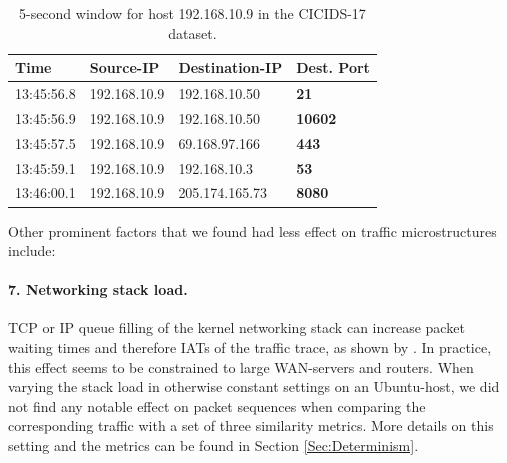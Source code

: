 \documentclass[runningheads]{llncs}
\begin{document}
\begin{table}[h!]
\centering
\begin{tabular}{l|l|l|>{\bfseries}l}
Time& Source-IP &Destination-IP& Dest. Port\\ \hline
13:45:56.8 & 192.168.10.9 & 192.168.10.50 &    21 \\ \hline
13:45:56.9 & 192.168.10.9 & 192.168.10.50 &  10602\\ \hline
13:45:57.5 & 192.168.10.9 & 69.168.97.166 &   443\\ \hline
13:45:59.1 & 192.168.10.9 &  192.168.10.3 &    53\\ \hline
13:46:00.1 & 192.168.10.9 & 205.174.165.73 &   8080\\ \hline
\end{tabular}
\vspace{0.2cm}
\caption{5-second window for host 192.168.10.9 in the CICIDS-17 dataset.}\label{Tab:Sess}
\vspace{-1cm}
\end{table}


Other prominent factors that we found had less effect on traffic microstructures include:

\paragraph{7. Networking stack load.}
TCP or IP queue filling of the kernel networking stack can increase packet waiting times and therefore IATs of the traffic trace, as shown by \cite{sequeira2013influence}. In practice, this effect seems to be constrained to large WAN-servers and routers. When varying the stack load in otherwise constant settings on an Ubuntu-host, we did not find any notable effect on packet sequences when comparing the corresponding traffic with a set of three similarity metrics. More details on this setting and the metrics can be found in Section \ref{Sec:Determinism}.



\end{document}
